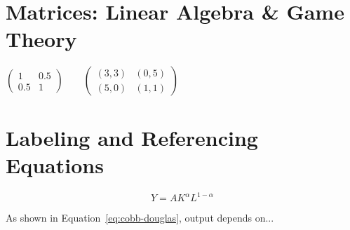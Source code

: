 \documentclass[11pt,a4paper]{article}
\begin{document}
\section*{Matrices: Linear Algebra \& Game Theory}
$\begin{pmatrix} 1 & 0.5 \\ 0.5 & 1 \end{pmatrix}
\qquad
\begin{pmatrix} (3,3) & (0,5) \\ (5,0) & (1,1) \end{pmatrix}$

\section*{Labeling and Referencing Equations}
\begin{equation}
  \label{eq:cobb-douglas}
  Y = A K^{\alpha} L^{1-\alpha}
\end{equation}

As shown in Equation~\eqref{eq:cobb-douglas}, output depends on...
\end{document}
